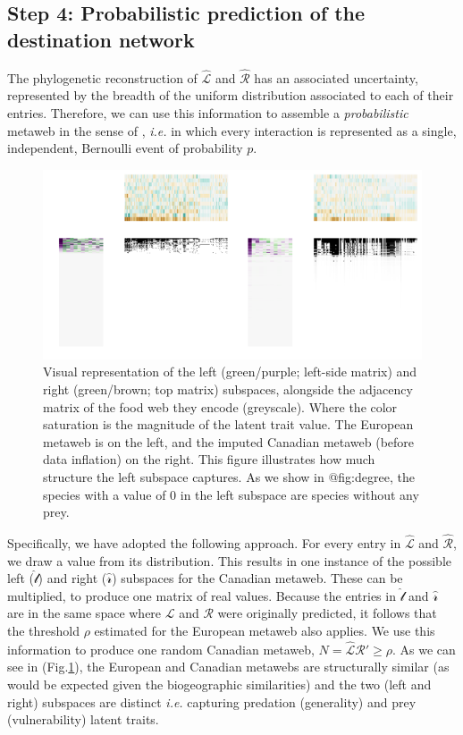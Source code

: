 \subsection{Step 4: Probabilistic prediction of the destination
network}\label{step-4-probabilistic-prediction-of-the-destination-network}

The phylogenetic reconstruction of \(\hat{\mathscr{L}}\) and
\(\hat{\mathscr{R}}\) has an associated uncertainty, represented by the
breadth of the uniform distribution associated to each of their entries.
Therefore, we can use this information to assemble a
\emph{probabilistic} metaweb in the sense of \cite{Poisot2016StrPro},
\emph{i.e.} in which every interaction is represented as a single,
independent, Bernoulli event of probability \(p\).

\begin{figure}[h]
    \centering
    \includegraphics[width=\textwidth]{figures/figure-subspaces.png}
    \caption{Visual representation of the left (green/purple; left-side
matrix) and right (green/brown; top matrix) subspaces, alongside the
adjacency matrix of the food web they encode (greyscale). Where the
color saturation is the magnitude of the latent trait value. The
European metaweb is on the left, and the imputed Canadian metaweb
(before data inflation) on the right. This figure illustrates how much
structure the left subspace captures. As we show in @fig:degree, the
species with a value of 0 in the left subspace are species without any
prey.}
    \label{fig:subspaces}
\end{figure}

Specifically, we have adopted the following approach. For every entry in
\(\hat{\mathscr{L}}\) and \(\hat{\mathscr{R}}\), we draw a value from
its distribution. This results in one instance of the possible left
(\(\hat{\mathscr{l}}\)) and right (\(\hat{\mathscr{r}}\)) subspaces for
the Canadian metaweb. These can be multiplied, to produce one matrix of
real values. Because the entries in \(\hat{\mathscr{l}}\) and
\(\hat{\mathscr{r}}\) are in the same space where \(\mathscr{L}\) and
\(\mathscr{R}\) were originally predicted, it follows that the threshold
\(\rho\) estimated for the European metaweb also applies. We use this
information to produce one random Canadian metaweb,
\(N = \hat{\mathscr{L}}\hat{\mathscr{R}}' \ge \rho\). As we can see in
(Fig.\ref{fig:subspaces}), the European and Canadian metawebs are structurally
similar (as would be expected given the biogeographic similarities) and
the two (left and right) subspaces are distinct \emph{i.e.} capturing
predation (generality) and prey (vulnerability) latent traits.

